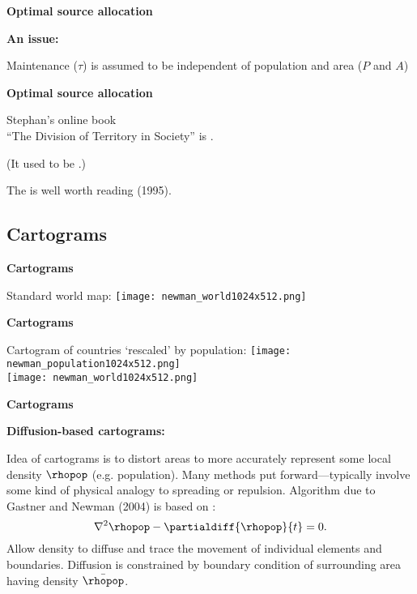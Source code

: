   


  \textbf{Optimal source allocation}

  \textbf{An issue:}
    
     Maintenance ($\tau$) is assumed to be 
      \alert{independent} of population
      and area ($P$ and $A$)
    
  
  

  \textbf{Optimal source allocation}

  
   
    Stephan's online book\\
    \alert{``The Division of Territory in Society''}
    is
    .
   
    (It used to be
    .)
   
    The 
    is well worth reading (1995).
  


\subsection{Cartograms}

  \textbf{Cartograms}

  Standard world map:
  \texttt{[image: newman\_world1024x512.png]}


  \textbf{Cartograms}

  Cartogram of countries `rescaled' by population:
  \texttt{[image: newman\_population1024x512.png]}\\
  \texttt{[image: newman\_world1024x512.png]}

  \textbf{Cartograms}

  \textbf{Diffusion-based cartograms:}
    
     Idea of cartograms is to \alert{distort areas} to 
      more accurately represent
      some local density $\rhopop$ (e.g. population).
     Many methods put forward---typically involve
      some kind of physical analogy to \alert{spreading or repulsion}.
     Algorithm due to Gastner and Newman (2004)\cite{gastner2004a}
      is based on :
      $$ 
      \nabla^2 \rhopop - \partialdiff{\rhopop}{t} = 0. 
      $$
     Allow density to diffuse and trace the 
      movement of individual elements and boundaries.
     Diffusion is constrained by boundary condition
      of surrounding area having density $\bar{\rhopop}$.
    
